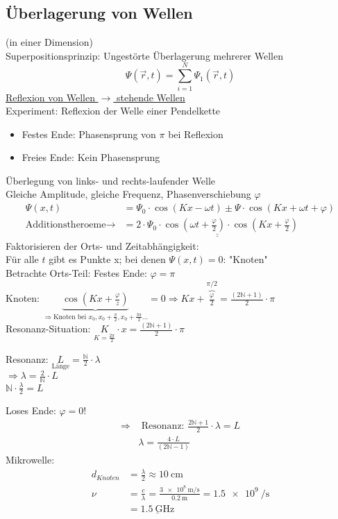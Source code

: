 \subsection{Überlagerung von Wellen} (in einer Dimension)\\
Superpositionsprinzip: Ungestörte Überlagerung mehrerer Wellen
$$ \Psi(\vec{r},t) = \sum_{i=1}^{N} \Psi_1(\vec{r},t)$$
\underline{Reflexion von Wellen $ \rightarrow $ stehende Wellen}\\
Experiment: Reflexion der Welle einer Pendelkette
\begin{itemize}
	\item Festes Ende: Phasensprung von $ \pi $ bei Reflexion
	\bild
	\item Freies Ende: Kein Phasensprung
	\bild
\end{itemize}
Überlegung von links- und rechts-laufender Welle\\
Gleiche Amplitude, gleiche Frequenz, Phasenverschiebung $ \varphi $
\begin{align*}
\Psi(x,t) &=\Psi_0 \cdot \cos(Kx-\omega t) \pm \Psi \cdot \cos(Kx+\omega t + \varphi)\\
\text{Additionstheroeme} \rightarrow &= \underline{\underline{2\cdot\Psi_0\cdot\cos(\omega t + \frac{\varphi}{2}) \cdot \cos(Kx+\frac{\varphi}{2})  } }
\end{align*}
Faktorisieren der Orts- und Zeitabhängigkeit:\\
Für alle $ t $ gibt es Punkte x; bei denen  $ \Psi(x,t) = 0 $: "Knoten"\\
Betrachte Orts-Teil: Festes Ende: $ \varphi = \pi $\\
Knoten: $ \underbrace{\cos(Kx+\frac{\varphi}{z})}_{\Rightarrow \text{Knoten bei } x_0, x_0+\frac{\pi}{2}, x_0+\frac{3\pi}{2}...} = 0 \Rightarrow Kx+\overbrace{\frac{\varphi}{2}}^{\pi/2}= \frac{(2\mathbb{N}+1)}{2} \cdot \pi $\\ \break
Resonanz-Situation: $  \underset{K=\frac{2\pi}{2}}{K} \cdot x = \frac{(2\mathbb{N}+1)}{2} \cdot \pi $\\
\begin{center}
	Resonanz: $ \underset{\text{Länge}}{L} = \frac{\mathbb{N}}{2} \cdot \lambda $\\
\underline{$ \Rightarrow \lambda = \frac{2}{\mathbb{N}}\cdot L $}\\
\underline{$ \mathbb{N}\cdot\frac{\lambda}{2} = L $}\\
\end{center}
 \bild
 Loses Ende: $ \varphi = 0 $!
 \begin{align*}
 \Rightarrow &\text{ Resonanz: } \frac{2\mathbb{N}+1}{2} \cdot \lambda = L\\
 &\lambda = \frac{4 \cdot L}{(2\mathbb{N}-1)}
 \end{align*}
 \bild
 Mikrowelle:
 \begin{align*}
 d_{Knoten} &= \frac{\lambda}{2} \approx \SI{10}{\centi\meter}\\
 \nu & = \frac{c}{\lambda} = \frac{\SI{3e8}{\meter\per\second}}{\SI{0,2}{\meter}} = \SI{1,5e9}{\per\second}\\
 &=\underline{\SI{1,5}{\giga\hertz}}
 \end{align*}
 \bild
 \bild